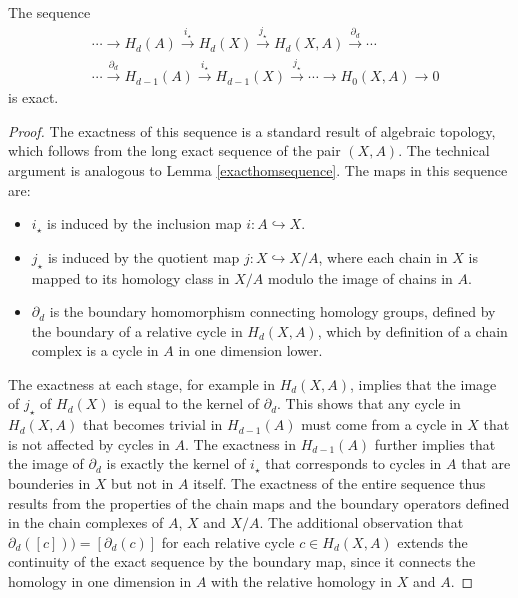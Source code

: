 \begin{corollary}{\cite[Theorem 2.16]{hatcher2005algebraic}}
	The sequence
	\begin{align}
		  & \cdots \rightarrow H_{d}(A) \xrightarrow{i_\star}H_{d}(X) \xrightarrow{j_\star} 
		H_{d}(X,A) \xrightarrow{\partial_d} \cdots \nonumber\\
		  & \cdots \xrightarrow{\partial_d} H_{d-1}(A) \xrightarrow{i_\star} H_{d-1}(X) \xrightarrow{j_\star} \cdots \rightarrow       
		H_{0}(X,A) \rightarrow 0
	\end{align}
	is exact.
\end{corollary}

\begin{proof}
	The exactness of this sequence is a standard result of algebraic topology, which follows from the long exact sequence of the pair \((X, A)\). The technical argument is analogous to Lemma \ref{exacthomsequence}. The maps in this sequence are:
	\begin{itemize}
		\item \(i_{\star}\) is induced by the inclusion map \(i: A \hookrightarrow X\).
		\item \(j_{\star}\) is induced by the quotient map \(j: X \hookrightarrow X/A\), where each chain in \(X\) is mapped to its homology class in \(X/A\) modulo the image of chains in \(A\).
		\item \(\partial_{d}\) is the boundary homomorphism connecting homology groups, defined by the boundary of a relative cycle in \(H_{d}(X, A)\), which by definition of a chain complex is a cycle in \(A\) in one dimension lower.
	\end{itemize}
	The exactness at each stage, for example in \(H_{d}(X, A)\), implies that the image of \(j_{\star}\) of \(H_{d}(X)\) is equal to the kernel of \(\partial_{d}\). This shows that any cycle in \(H_{d}(X, A)\) that becomes trivial in \(H_{d-1}(A)\) must come from a cycle in \(X\) that is not affected by cycles in \(A\). The exactness in \(H_{d-1}(A)\) further implies that the image of \(\partial_{d}\) is exactly the kernel of \(i_{\star}\) that corresponds to cycles in \(A\) that are bounderies in \(X\) but not in \(A\) itself. The exactness of the entire sequence thus results from the properties of the chain maps and the boundary operators defined in the chain complexes of \(A\), \(X\) and \(X/A\). The additional observation that \(\partial_{d}([c])) = [\partial_{d}(c)]\) for each relative cycle \(c \in H_{d}(X, A)\) extends the continuity of the exact sequence by the boundary map, since it connects the homology in one dimension in \(A\) with the relative homology in \(X\) and \(A\).
\end{proof}



